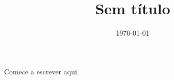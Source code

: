 \documentclass{article}
\title{Sem título}
\author{}
\date{\today}
\begin{document}
\maketitle

Comece a escrever aqui.
\end{document}
